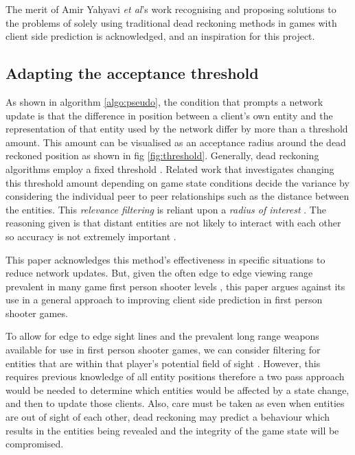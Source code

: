 \documentclass[journal]{IEEEtran}
\begin{document}
The merit of Amir Yahyavi \textit{et al}'s work \cite{yahyavi2011antreckoning} \cite{yahyavi2013interest} recognising and proposing solutions to the problems of solely using traditional dead reckoning methods in games with client side prediction is acknowledged, and an inspiration for this project.

\subsection{Adapting the acceptance threshold}

As shown in algorithm \ref{algo:pseudo}, the condition that prompts a network update is that the difference in position between a client's own entity and the representation of that entity used by the network differ by more than a threshold amount. This amount can be visualised as an acceptance radius around the dead reckoned position as shown in fig \ref{fig:threshold}. Generally, dead reckoning algorithms employ a fixed threshold \cite{cai1999auto}. Related work that investigates changing this threshold amount depending on game state conditions decide the variance by considering the individual peer to peer relationships such as the distance between the entities. This \textit{relevance filtering} is reliant upon a \textit{radius of interest} \cite{rak1996evaluation}. The reasoning given is that distant entities are not likely to interact with each other so accuracy is not extremely important  \cite{cai1999auto} \cite{jaya2016combining}.

This paper acknowledges this method's effectiveness in specific situations to reduce network updates. But, given the often edge to edge viewing range prevalent in many game first person shooter levels \cite{toby2014tobyscs} \cite{ziervogel2014nag} \cite{cod2018wikibo4}, this paper argues against its use in a general approach to improving client side prediction in first person shooter games.

To allow for edge to edge sight lines and the prevalent long range weapons available for use in first person shooter games, we can consider filtering for entities that are within that player’s potential field of sight \cite{cronin2001distributed}. However, this requires previous knowledge of all entity positions therefore a two pass approach would be needed to determine which entities would be affected by a state change, and then to update those clients. Also, care must be taken as even when entities are out of sight of each other, dead reckoning may predict a behaviour which results in the entities being revealed and the integrity of the game state will be compromised.
\end{document}
